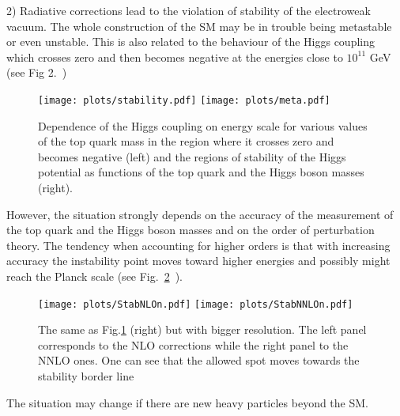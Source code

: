 \documentclass{cernyrep}
\begin{document}
2) Radiative corrections lead to the violation of  stability of the electroweak vacuum. The whole construction of the SM may be in trouble being metastable or even unstable. This is also related to the behaviour of the Higgs coupling which crosses zero and then becomes negative at the energies close to $10^{11}$ GeV (see Fig 2.~\cite{Degrassi}) 
\begin{figure}[htb]
\begin{center}
\leavevmode
\texttt{[image: plots/stability.pdf]}\hspace{1cm}
\texttt{[image: plots/meta.pdf]}
\end{center}
\caption{Dependence of the Higgs coupling on energy scale for various values of the top quark mass  in the region where it crosses zero and becomes negative (left) and the regions of stability of the Higgs potential as functions of the top quark and the Higgs boson masses (right).}
\label{Sigma_b}
\end{figure}
However, the situation strongly depends on the accuracy of the measurement of the top quark and the Higgs boson masses and on the order of perturbation theory. The tendency when accounting for higher orders is that with increasing accuracy the instability point moves toward higher energies and possibly might reach the Planck scale (see Fig.~\ref{Sigma_c}~\cite{Espinosa}). 
\begin{figure}[ht!]
\begin{center}
\leavevmode
\texttt{[image: plots/StabNLOn.pdf]}\hspace{1cm}
\texttt{[image: plots/StabNNLOn.pdf]}
\end{center}
\caption{The same as Fig.\ref{Sigma_b} (right) but with bigger resolution. The left panel corresponds to the NLO corrections while the right panel to the NNLO ones. One can see that the allowed spot moves towards the stability border line}
\label{Sigma_c}
\end{figure}
The situation may change if there are new heavy particles beyond the SM.
\end{document}
